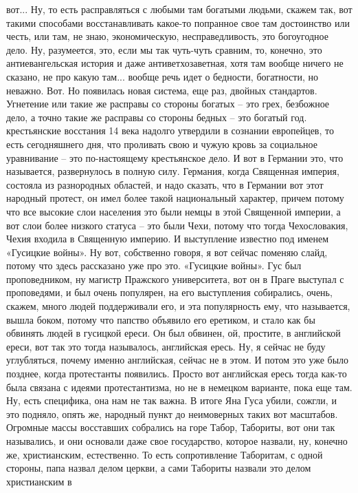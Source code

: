 вот... Ну, то есть расправляться с любыми там богатыми людьми, скажем так, вот
такими способами восстанавливать какое-то попранное свое там достоинство или
честь, или там, не знаю, экономическую, несправедливость, это богоугодное дело.
Ну, разумеется, это, если мы так чуть-чуть сравним, то, конечно, это
антиевангельская история и даже антиветхозаветная, хотя там вообще ничего не
сказано, не про какую там... вообще речь идет о бедности, богатности, но
неважно. Вот. Но появилась новая система, еще раз, двойных стандартов. Угнетение
или такие же расправы со стороны богатых – это грех, безбожное дело, а точно
такие же расправы со стороны бедных – это богатый год. крестьянские восстания 14
века надолго утвердили в сознании европейцев, то есть сегодняшнего дня, что
проливать свою и чужую кровь за социальное уравнивание – это по-настоящему
крестьянское дело. И вот в Германии это, что называется, развернулось в полную
силу. Германия, когда Священная империя, состояла из разнородных областей, и
надо сказать, что в Германии вот этот народный протест, он имел более такой
национальный характер, причем потому что все высокие слои населения это были
немцы в этой Священной империи, а вот слои более низкого статуса – это были
Чехи, потому что тогда Чехословакия, Чехия входила в Священную империю. И
выступление известно под именем «Гусицкие войны». Ну вот, собственно говоря, я
вот сейчас поменяю слайд, потому что здесь рассказано уже про это. «Гусицкие
войны». Гус был проповедником, ну магистр Пражского университета, вот он в Праге
выступал с проповедями, и был очень популярен, на его выступления собирались,
очень, скажем, много людей поддерживали его, и эта популярность ему, что
называется, вышла боком, потому что папство объявило его еретиком, и стало как
бы обвинять людей в гусицкой ереси. Он был обвинен, ой, простите, в английской
ереси, вот так это тогда называлось, английская ересь. Ну, я сейчас не буду
углубляться, почему именно английская, сейчас не в этом. И потом это уже было
позднее, когда протестанты появились. Просто вот английская ересь тогда как-то
была связана с идеями протестантизма, но не в немецком варианте, пока еще там.
Ну, есть специфика, она нам не так важна. В итоге Яна Гуса убили, сожгли, и это
подняло, опять же, народный пункт до неимоверных таких вот масштабов. Огромные
массы восставших собрались на горе Табор, Табориты, вот они так назывались, и
они основали даже свое государство, которое назвали, ну, конечно же,
христианским, естественно. То есть сопротивление Таборитам, с одной стороны,
папа назвал делом церкви, а сами Табориты назвали это делом христианским в
